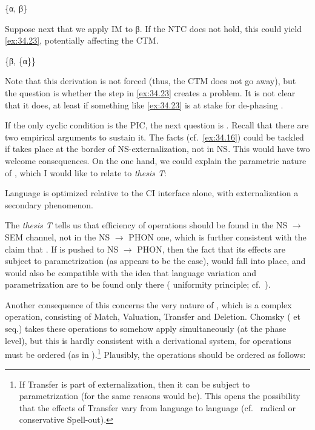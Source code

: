 \documentclass[output=paper]{langsci/langscibook}
\begin{document}
\ea%
    \label{ex:34.22}
    \{α, β\}
\z

Suppose next that we apply \gls{IM} to β. If the \gls{NTC} does not hold, this
could yield \eqref{ex:34.23}, potentially affecting the \gls{CTM}.

\ea%
    \label{ex:34.23}
    \{β, \{α\}\}
\z

Note that this derivation is not forced (thus, the \gls{CTM} does not go away),
but the question is whether the step in \eqref{ex:34.23} creates a problem. It is not clear
that it does, at least if something like \eqref{ex:34.23} is at stake for de-phasing
\parencite[cf.][]{Chomsky2015}.

If the only cyclic condition is the \gls{PIC}, the next question is .
Recall that there are two empirical arguments to sustain it. The 
facts (cf.~\ref{ex:34.16}) could be tackled if  takes place at the border of
\gls{NS}-externalization, not in \gls{NS}. This would have two welcome
consequences. On the one hand, we could explain the parametric nature of ,
which I would like to relate to  \emph{thesis T}:

\ea%
    \label{ex:34.24}
    Language is optimized relative to the \gls{CI} interface alone, with
    externalization a secondary phenomenon. \parencite[7]{Chomsky2014}
\z

The \emph{thesis T} tells us that efficiency of operations should be found in
the \gls{NS} $\rightarrow$ SEM channel, not in the \gls{NS} $\rightarrow$ PHON
one, which is further consistent with the claim that
. If  is pushed to NS ${\rightarrow}$
PHON, then the fact that its effects are subject to parametrization (as appears
to be the case), would fall into place, and would also be compatible with the
idea that language variation and parametrization are to be found only there
( uniformity principle; cf.~\citealt{Chomsky2010,BerCho2011}).

Another consequence of this concerns the very nature of , which is a
complex operation, consisting of Match, Valuation, Transfer and Deletion.
Chomsky (\citeyear{Chomsky2004} et seq.) takes these operations to somehow apply simultaneously
(at the phase level), but this is hardly consistent with a derivational system,
for operations must be ordered (as in \citealt{Chomsky2015}).\footnote{If
    Transfer is part of externalization, then it can be subject to
    parametrization (for the same reasons  would be). This opens the
possibility that the effects of Transfer vary from language to language
(cf.~ radical or conservative Spell-out).}
Plausibly, the operations should be ordered as follows:
\end{document}
